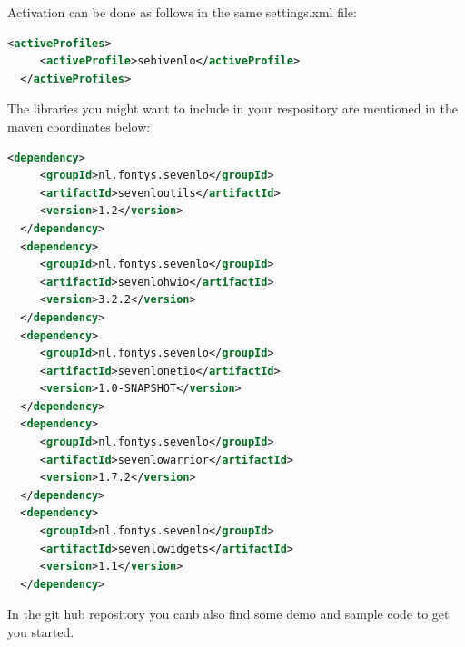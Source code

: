 Activation can be done as follows in the same settings.xml file:

\begin{lstlisting}[language=xml,caption={activate profile}]
  <activeProfiles>
     <activeProfile>sebivenlo</activeProfile>
  </activeProfiles>
\end{lstlisting}

The libraries you might want to include in your respository are mentioned in the maven coordinates below:

\begin{lstlisting}[language=xml,caption={All sebivenlo io stuff. Add/adapt version numbers before use.}]
  <dependency>
     <groupId>nl.fontys.sevenlo</groupId>
     <artifactId>sevenloutils</artifactId>
     <version>1.2</version>
  </dependency>
  <dependency>
     <groupId>nl.fontys.sevenlo</groupId>
     <artifactId>sevenlohwio</artifactId>
     <version>3.2.2</version>
  </dependency>
  <dependency>
     <groupId>nl.fontys.sevenlo</groupId>
     <artifactId>sevenlonetio</artifactId>
     <version>1.0-SNAPSHOT</version>
  </dependency>
  <dependency>
     <groupId>nl.fontys.sevenlo</groupId>
     <artifactId>sevenlowarrior</artifactId>
     <version>1.7.2</version>
  </dependency>
  <dependency>
     <groupId>nl.fontys.sevenlo</groupId>
     <artifactId>sevenlowidgets</artifactId>
     <version>1.1</version>
  </dependency>
\end{lstlisting}


In the git hub repository you canb also find some demo and sample code to get you started.





